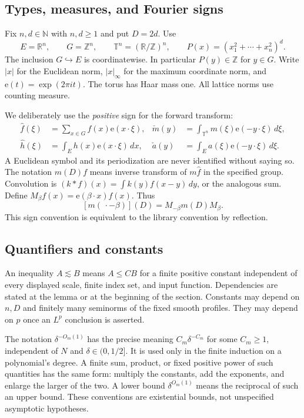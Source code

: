 \documentclass[11pt,oneside]{article}
\theoremstyle{definition}\newtheorem{definition}[theorem]{Definition}
\theoremstyle{remark}\newtheorem{remark}[theorem]{Remark}
\newcommand{\R}{\mathbb R}\newcommand{\Z}{\mathbb Z}\newcommand{\N}{\mathbb N}\newcommand{\Q}{\mathbb Q}\newcommand{\C}{\mathbb C}\newcommand{\T}{\mathbb T}
\newcommand{\ee}[1]{\mathrm e\!\left(#1\right)}
\begin{document}
\subsection{Types, measures, and Fourier signs}
Fix $n,d\in\N$ with $n,d\geq1$ and put $D=2d$. Use
\[
 E=\R^n,\qquad G=\Z^n,\qquad \T^n=(\R/\Z)^n,
 \qquad P(x)=(x_1^2+\cdots+x_n^2)^d.
\]
The inclusion $G\hookrightarrow E$ is coordinatewise. In particular $P(y)\in\Z$
for $y\in G$. Write $|x|$ for the Euclidean norm, $|x|_\infty$ for the maximum
coordinate norm, and $\mathrm e(t)=\exp(2\pi i t)$. The torus has Haar mass one.
All lattice norms use counting measure.

We deliberately use the \emph{positive} sign for the forward transform:
\begin{align*}
 \widehat f(\xi)&=\sum_{x\in G}f(x)\ee{x\cdot\xi},&
 \check m(y)&=\int_{\T^n}m(\xi)\ee{-y\cdot\xi}\,d\xi,\\
 \widehat h(\xi)&=\int_Eh(x)\ee{x\cdot\xi}\,dx,&
 \check a(y)&=\int_Ea(\xi)\ee{-y\cdot\xi}\,d\xi.
\end{align*}
A Euclidean symbol and its periodization are never identified without saying
so. The notation $m(D)f$ means inverse transform of $m\widehat f$ in the
specified group. Convolution is $(k*f)(x)=\int k(y)f(x-y)\,dy$, or the analogous
sum. Define $M_\beta f(x)=\ee{\beta\cdot x}f(x)$. Thus
\begin{equation}\label{eq:modulation}
 [m(\,\cdot-\beta)](D)=M_{-\beta}m(D)M_\beta.
\end{equation}
This sign convention is equivalent to the library convention by reflection.

\subsection{Quantifiers and constants}
An inequality $A\lesssim B$ means $A\leq CB$ for a finite positive constant
independent of every displayed scale, finite index set, and input function.
Dependencies are stated at the lemma or at the beginning of the section.
Constants may depend on $n,D$ and finitely many seminorms of the fixed smooth
profiles. They may depend on $p$ once an $L^p$ conclusion is asserted.

The notation $\delta^{-O_m(1)}$ has the precise meaning
$C_m\delta^{-C_m}$ for some $C_m\geq1$, independent of $N$ and $\delta\in(0,1/2]$.
It is used only in the finite induction on a polynomial's degree. A finite sum,
product, or fixed positive power of such quantities has the same form: multiply
the constants, add the exponents, and enlarge the larger of the two. A lower
bound $\delta^{O_m(1)}$ means the reciprocal of such an upper bound. These
conventions are existential bounds, not unspecified asymptotic hypotheses.
\end{document}
